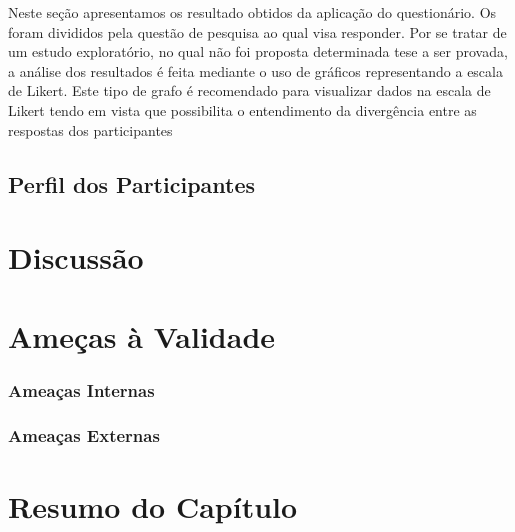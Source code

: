Neste seção apresentamos os resultado obtidos da aplicação do questionário. Os
foram divididos pela questão de pesquisa ao qual visa responder. Por se tratar
de um estudo exploratório, no qual não foi proposta determinada tese a ser
provada, a análise dos resultados é feita mediante o uso de gráficos
representando a escala de Likert. Este tipo de grafo é recomendado para
visualizar dados na escala de Likert tendo em vista que possibilita o
entendimento da divergência entre as respostas dos
participantes~\cite{robbins2011plotting}

\subsection{Perfil dos Participantes}
\label{sub:perfil_dos_participantes}

\section{Discussão}

\section{Ameças à Validade}

\subsubsection{Ameaças Internas}
\label{ssub:Ameacas_internas}

\subsubsection{Ameaças Externas}
\label{ssub:Ameacas_externas}


\section{Resumo do Capítulo}
\label{sec:resumo_do_capitulo}
